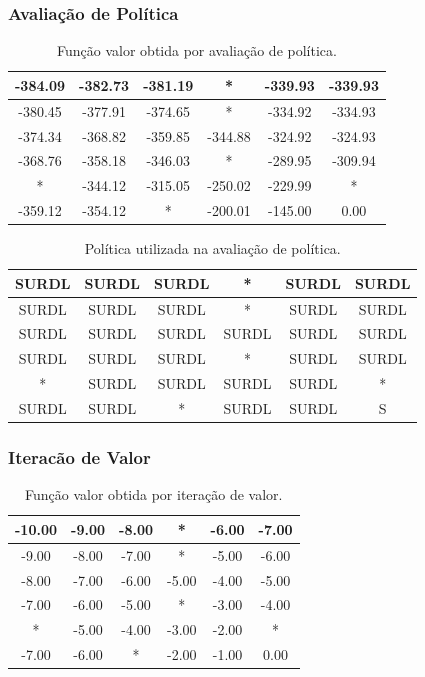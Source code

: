 \documentclass[a4paper,12pt]{article}
\begin{document}
\subsubsection{Avaliação de Política}

\begin{table}[htbp]
\centering
\begin{tabular}{|c|c|c|c|c|c|}
\hline
-384.09 & -382.73 & -381.19 & *       & -339.93 & -339.93 \\
\hline
-380.45 & -377.91 & -374.65 & *       & -334.92 & -334.93 \\
\hline
-374.34 & -368.82 & -359.85 & -344.88 & -324.92 & -324.93 \\
\hline
-368.76 & -358.18 & -346.03 & *       & -289.95 & -309.94 \\
\hline
*       & -344.12 & -315.05 & -250.02 & -229.99 & *       \\
\hline
-359.12 & -354.12 & *       & -200.01 & -145.00 & 0.00    \\
\hline
\end{tabular}
\caption{Função valor obtida por avaliação de política.}
\end{table}

\begin{table}[htbp]
\centering
\begin{tabular}{|c|c|c|c|c|c|}
\hline
SURDL & SURDL & SURDL & *     & SURDL & SURDL \\
\hline
SURDL & SURDL & SURDL & *     & SURDL & SURDL \\
\hline
SURDL & SURDL & SURDL & SURDL & SURDL & SURDL \\
\hline
SURDL & SURDL & SURDL & *     & SURDL & SURDL \\
\hline
*     & SURDL & SURDL & SURDL & SURDL & *     \\
\hline
SURDL & SURDL & *     & SURDL & SURDL & S     \\
\hline
\end{tabular}
\caption{Política utilizada na avaliação de política.}
\end{table}

\newpage

\subsubsection{Iteracão de Valor}

\begin{table}[htbp]
\centering
\begin{tabular}{|c|c|c|c|c|c|}
\hline
-10.00 & -9.00 & -8.00 & *     & -6.00 & -7.00 \\
\hline
-9.00  & -8.00 & -7.00 & *     & -5.00 & -6.00 \\
\hline
-8.00  & -7.00 & -6.00 & -5.00 & -4.00 & -5.00 \\
\hline
-7.00  & -6.00 & -5.00 & *     & -3.00 & -4.00 \\
\hline
*      & -5.00 & -4.00 & -3.00 & -2.00 & *     \\
\hline
-7.00  & -6.00 & *     & -2.00 & -1.00 & 0.00  \\
\hline
\end{tabular}
\caption{Função valor obtida por iteração de valor.}
\end{table}
\end{document}

